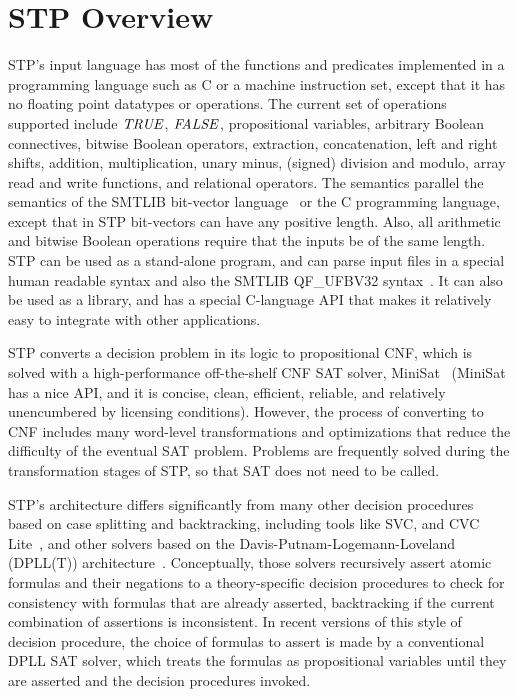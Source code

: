 \section{STP Overview}

STP's input language has most of the functions and predicates
implemented in a programming language such as C or a machine
instruction set, except that it has no floating point datatypes or
operations. The current set of operations supported include
${\it TRUE}$, ${\it FALSE}$, propositional variables, arbitrary Boolean
connectives, bitwise Boolean operators, extraction, concatenation,
left and right shifts, addition, multiplication, unary minus, (signed)
division and modulo, array read and write functions, and relational
operators. The semantics parallel the semantics of the SMTLIB
bit-vector language~\cite{smtlib} or the C programming language, except
that in STP bit-vectors can have any positive length. Also, all
arithmetic and bitwise Boolean operations require that the inputs be
of the same length. STP can be used as a stand-alone program, and can
parse input files in a special human readable syntax and also the
SMTLIB QF\_UFBV32 syntax~\cite{smtlib}. It can also be used as a
library, and has a special C-language API that makes it relatively
easy to integrate with other applications.

STP converts a decision problem in its logic to propositional CNF,
which is solved with a high-performance off-the-shelf CNF SAT solver,
MiniSat~\cite{minisat} (MiniSat has a nice API, and it is concise,
clean, efficient, reliable, and relatively unencumbered by licensing
conditions).  However, the process of converting to CNF includes many
word-level transformations and optimizations that reduce the
difficulty of the eventual SAT problem.  Problems are frequently
solved during the transformation stages of STP, so that SAT does not
need to be called.

STP's architecture differs significantly from many other decision
procedures based on case splitting and backtracking, including tools
like SVC, and CVC Lite~\cite{svc,cvcl}, and other solvers
based on the Davis-Putnam-Logemann-Loveland (DPLL(T))
architecture~\cite{ganzinger04dpllt}.  Conceptually, those solvers
recursively assert atomic formulas and their negations to a
theory-specific decision procedures to check for consistency with
formulas that are already asserted, backtracking if the current
combination of assertions is inconsistent.  In recent versions of this
style of decision procedure, the choice of formulas to assert is made
by a conventional DPLL SAT solver, which treats the formulas as
propositional variables until they are asserted and the decision
procedures invoked.

